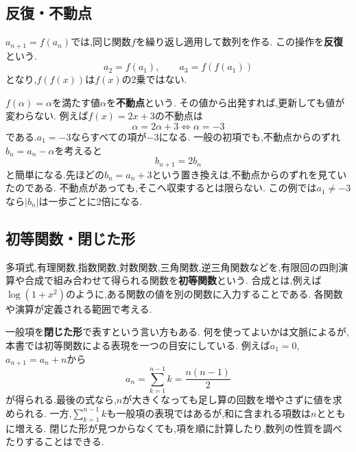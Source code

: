   \subsection{反復・不動点}\label{節：用語解説：反復・不動点}
    $a_{n+1}=f(a_n)$では,同じ関数$f$を繰り返し適用して数列を作る.
    この操作を\textbf{反復}という.
    \[
      a_2=f(a_1),\qquad a_3=f(f(a_1))
    \]
    となり,$f(f(x))$は$f(x)$の2乗ではない.

    $f(\alpha)=\alpha$を満たす値$\alpha$を\textbf{不動点}という.
    その値から出発すれば,更新しても値が変わらない.
    例えば$f(x)=2x+3$の不動点は
    \[
      \alpha=2\alpha+3\iff\alpha=-3
    \]
    である.$a_1=-3$ならすべての項が$-3$になる.
    一般の初項でも,不動点からのずれ$b_n=a_n-\alpha$を考えると
    \[
      b_{n+1}=2b_n
    \]
    と簡単になる.先ほどの$b_n=a_n+3$という置き換えは,不動点からのずれを見ていたのである.
    不動点があっても,そこへ収束するとは限らない.
    この例では$a_1\ne-3$なら$|b_n|$は一歩ごとに2倍になる.

  \subsection{初等関数・閉じた形}\label{節：用語解説：初等関数・閉じた形}
    多項式,有理関数,指数関数,対数関数,三角関数,逆三角関数などを,有限回の四則演算や合成で組み合わせて得られる関数を\textbf{初等関数}という.
    合成とは,例えば$\log(1+x^2)$のように,ある関数の値を別の関数に入力することである.
    各関数や演算が定義される範囲で考える.

    一般項を\textbf{閉じた形}で表すという言い方もある.
    何を使ってよいかは文脈によるが,本書では初等関数による表現を一つの目安にしている.
    例えば$a_1=0$,\,$a_{n+1}=a_n+n$から
    \[
      a_n=\sum_{k=1}^{n-1}k=\frac{n(n-1)}{2}
    \]
    が得られる.最後の式なら,$n$が大きくなっても足し算の回数を増やさずに値を求められる.
    一方,$\sum_{k=1}^{n-1}k$も一般項の表現ではあるが,和に含まれる項数は$n$とともに増える.
    閉じた形が見つからなくても,項を順に計算したり,数列の性質を調べたりすることはできる.

